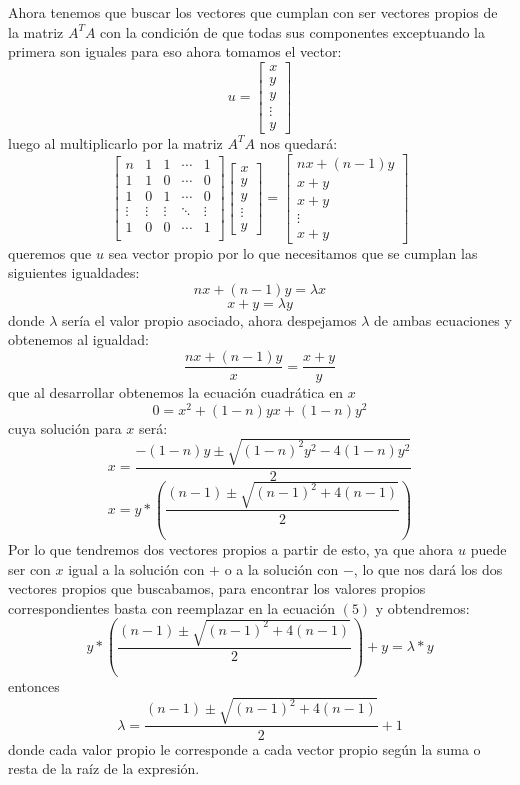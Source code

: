 \documentclass{article}
\begin{document}
Ahora tenemos que buscar los vectores que cumplan con ser vectores propios de la matriz $A^{T}A$ con la condición de que todas sus componentes exceptuando la primera son iguales para eso ahora tomamos el vector:
$$u=
\begin{bmatrix}
x\\
y\\
y\\
\vdots\\
y
\end{bmatrix}
$$
luego al multiplicarlo por la matriz $A^{T}A$ nos quedará:
$$
\begin{bmatrix}
n&1&1&\cdots&1\\
1&1&0&\cdots&0\\
1&0&1&\cdots&0\\
\vdots&\vdots&\vdots&\ddots&\vdots\\
1&0&0&\cdots&1\\
\end{bmatrix}
\begin{bmatrix}
x\\
y\\
y\\
\vdots\\
y
\end{bmatrix}
=
\begin{bmatrix}
nx + (n-1)y\\
x+y\\
x+y\\
\vdots\\
x+y
\end{bmatrix}
$$
queremos que $u$ sea vector propio por lo que necesitamos que se cumplan las siguientes igualdades:
\begin{equation}
nx + (n-1)y = \lambda x
\end{equation}
\begin{equation}
x+y = \lambda y
\end{equation}
donde $\lambda$ sería el valor propio asociado, ahora despejamos $\lambda$ de ambas ecuaciones y obtenemos al igualdad:
$$\frac{nx + (n-1)y}{x} = \frac{x+y}{y}$$
que al desarrollar obtenemos la ecuación cuadrática en $x$
$$0 = x^{2}+(1-n)yx +(1-n)y^{2}$$
cuya solución para $x$ será:
$$x = \frac{-(1-n)y \pm \sqrt{(1-n)^{2}y^{2}-4(1-n)y^{2}}}{2}$$
$$x = y*\left(\frac{(n-1) \pm \sqrt{(n-1)^{2}+4(n-1)}}{2}\right)$$
Por lo que tendremos dos vectores propios a partir de esto, ya que ahora $u$ puede ser con $x$ igual a la solución con $+$ o a la solución con $-$, lo que nos dará los dos vectores propios que buscabamos, para encontrar los valores propios correspondientes basta con reemplazar en la ecuación $(5)$ y obtendremos:
$$ y*\left(\frac{(n-1) \pm \sqrt{(n-1)^{2}+4(n-1)}}{2}\right) + y = \lambda * y$$
entonces 
$$\lambda = \frac{(n-1) \pm \sqrt{(n-1)^{2}+4(n-1)}}{2} + 1$$
donde cada valor propio le corresponde a cada vector propio según la suma o resta de la raíz de la expresión.\\
\end{document}

